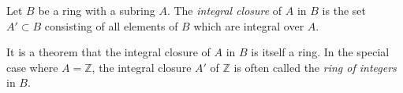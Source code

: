 \documentclass[12pt]{article}
\begin{document}
Let $B$ be a ring with a subring $A$. The {\em integral closure} of $A$ in $B$ is the set $A' \subset B$ consisting of all elements of $B$ which are integral over $A$.

It is a theorem that the integral closure of $A$ in $B$ is itself a ring. In the special case where $A = \mathbb{Z}$, the integral closure $A'$ of $\mathbb{Z}$ is often called the {\em ring of integers} in $B$.
\end{document}
